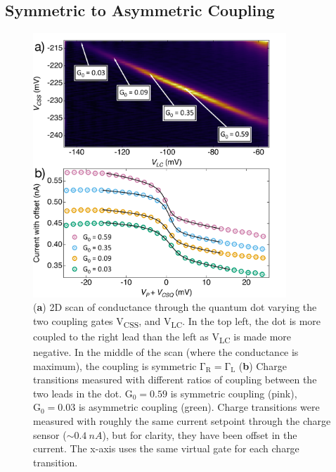 \subsection{Symmetric to Asymmetric Coupling}


\begin{figure}[!hbt]
 \begin{center}
 \includegraphics[width=0.85\textwidth]{figures/ch3/figure18.pdf}
 \caption[Symmetric to Asymmetric Coupling]{\label{fig:ch3/symmetry_picking} 
 (\textbf{a}) 2D scan of conductance through the quantum dot varying the two coupling gates V\textsubscript{CSS}, and V\textsubscript{LC}. In the top left, the dot is more coupled to the right lead than the left as V\textsubscript{LC} is made more negative. In the middle of the scan (where the conductance is maximum), the coupling is symmetric $\mathrm{\Gamma_R} = \mathrm{\Gamma_L}$ (\textbf{b}) Charge transitions measured with different ratios of coupling between the two leads in the dot. $\mathrm{G_0} = 0.59$ is symmetric coupling (pink), $\mathrm{G_0} = 0.03$ is asymmetric coupling (green). Charge transitions were measured with roughly the same current setpoint through the charge sensor ($\sim\qty{0.4}{nA}$), but for clarity, they have been offset in the current. The x-axis uses the same virtual gate for each charge transition. 
 }
 \end{center}
\end{figure}


